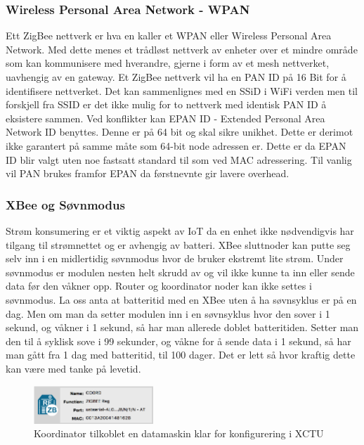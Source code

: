 \documentclass{article}
\begin{document}
\subsubsection{Wireless Personal Area Network - WPAN}
Ett ZigBee nettverk er hva en kaller et WPAN eller Wireless Personal Area Network. Med dette menes et trådløst nettverk av enheter over et mindre område som kan kommunisere med hverandre, gjerne i form av et mesh nettverket, uavhengig av en gateway. Et ZigBee nettverk vil ha en PAN ID på 16 Bit for å identifisere nettverket. Det kan sammenlignes med en SSiD i WiFi verden men til forskjell fra SSID er det ikke mulig for to nettverk med identisk PAN ID å eksistere sammen. Ved konflikter kan EPAN ID - Extended Personal Area Network ID benyttes. Denne er på 64 bit og skal sikre unikhet. Dette er derimot ikke garantert på samme måte som 64-bit node adressen er. Dette er da EPAN ID blir valgt uten noe fastsatt standard til som ved MAC adressering. Til vanlig vil PAN brukes framfor EPAN da førstnevnte gir lavere overhead.



\subsubsection{XBee og Søvnmodus}
Strøm konsumering er et viktig aspekt av IoT da en enhet ikke nødvendigvis har tilgang til strømnettet og er avhengig av batteri. XBee sluttnoder kan putte seg selv inn i en midlertidig søvnmodus hvor de bruker ekstremt lite strøm. Under søvnmodus er modulen nesten helt skrudd av og vil ikke kunne ta inn eller sende data før den våkner opp. Router og koordinator noder kan ikke settes i søvnmodus. La oss anta at batteritid med en XBee uten å ha søvnsyklus er på en dag. Men om man da setter modulen inn i en søvnsyklus hvor den sover i 1 sekund, og våkner i 1 sekund, så har man allerede doblet batteritiden. Setter man den til å syklisk sove i 99 sekunder, og våkne for å sende data i 1 sekund, så har man gått fra 1 dag med batteritid, til 100 dager. Det er lett så hvor kraftig dette kan være med tanke på levetid. 

\begin{figure}[h!]
\centering
   \includegraphics[width=0.4\textwidth]{xctucoord}
\caption{Koordinator tilkoblet en datamaskin klar for konfigurering i XCTU}
\end{figure}
\end{document}
